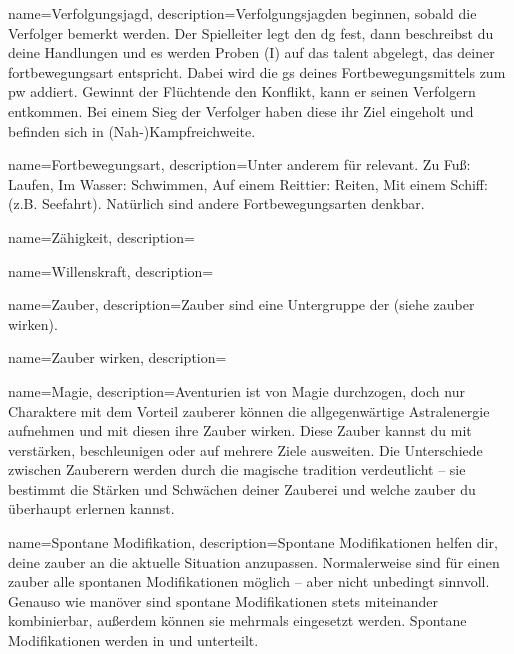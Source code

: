 
{
    name={Verfolgungsjagd},
    description={Verfolgungsjagden beginnen, sobald die Verfolger bemerkt werden. Der Spielleiter legt den \gls{dg} fest, dann beschreibst du deine Handlungen und es werden Proben (\gls{I}) auf das \gls{talent} abgelegt, das deiner \gls{fortbewegungsart} entspricht. Dabei wird die \gls{gs} deines Fortbewegungsmittels zum \gls{pw} addiert. Gewinnt der Flüchtende den Konflikt, kann er seinen Verfolgern entkommen. Bei einem Sieg der Verfolger haben diese ihr Ziel eingeholt und befinden sich in (Nah-)Kampfreichweite.}}

{
    name={Fortbewegungsart},
    description={Unter anderem für  relevant. Zu Fuß: Laufen, Im Wasser: Schwimmen, Auf einem Reittier: Reiten, Mit einem Schiff:  (z.B. Seefahrt). Natürlich sind andere Fortbewegungsarten denkbar.}}
        
    

{
    name={Zähigkeit},
    description={}}

{
    name={Willenskraft},
    description={}}
        
        

{
    name={Zauber},
    description={Zauber sind eine Untergruppe der  (siehe \gls{zauber wirken}).}}

{
    name={Zauber wirken},
    description={}}
        

{
    name={Magie},
    description={Aventurien ist von Magie durchzogen, doch nur Charaktere mit dem Vorteil \gls{zauberer} können die allgegenwärtige Astralenergie aufnehmen und mit diesen  ihre Zauber wirken. Diese Zauber kannst du mit  verstärken, beschleunigen oder auf mehrere Ziele ausweiten. Die Unterschiede zwischen Zauberern werden durch die \gls{magische tradition} verdeutlicht – sie bestimmt die Stärken und Schwächen deiner Zauberei und welche \gls{zauber} du überhaupt erlernen kannst.}}

{
    name={Spontane Modifikation},
    description={Spontane Modifikationen helfen dir, deine \gls{zauber} an die aktuelle Situation anzupassen. Normalerweise sind für einen \gls{zauber} alle spontanen Modifikationen möglich – aber nicht unbedingt sinnvoll. Genauso wie \gls{manöver} sind spontane Modifikationen stets miteinander kombinierbar, außerdem können sie mehrmals eingesetzt werden. Spontane Modifikationen werden in  und  unterteilt.}}

